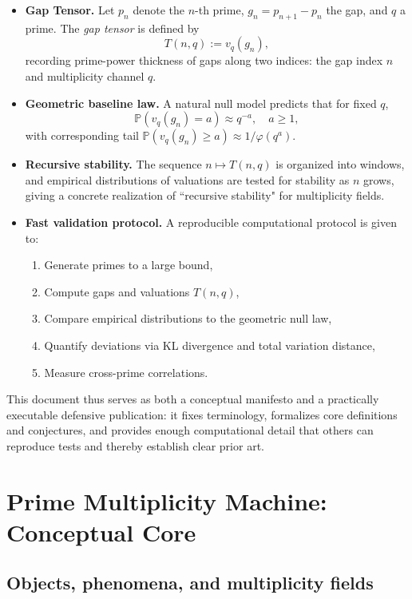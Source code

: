 \documentclass[11pt]{article}
\theoremstyle{definition}
\theoremstyle{plain}
\theoremstyle{remark}
\newcommand{\Prob}{\mathbb{P}}
\newcommand{\1}{\mathbb{1}}
\begin{document}
\begin{itemize}[leftmargin=*]
  \item \textbf{Gap Tensor.} Let \(p_n\) denote the \(n\)-th prime, \(g_n = p_{n+1}-p_n\) the gap, and \(q\) a prime. The \emph{gap tensor} is defined by
  \[
    T(n,q) := v_q(g_n),
  \]
  recording prime-power thickness of gaps along two indices: the gap index \(n\) and multiplicity channel \(q\).
  \item \textbf{Geometric baseline law.} A natural null model predicts that for fixed \(q\),
  \[
    \Prob( v_q(g_n) = a ) \approx q^{-a}, \quad a\ge 1,
  \]
  with corresponding tail \(\Prob(v_q(g_n)\ge a)\approx 1/\varphi(q^a)\).
  \item \textbf{Recursive stability.} The sequence \(n\mapsto T(n,q)\) is organized into windows, and empirical distributions of valuations are tested for stability as \(n\) grows, giving a concrete realization of ``recursive stability" for multiplicity fields.
  \item \textbf{Fast validation protocol.} A reproducible computational protocol is given to:
  \begin{enumerate}[leftmargin=*]
    \item Generate primes to a large bound,
    \item Compute gaps and valuations \(T(n,q)\),
    \item Compare empirical distributions to the geometric null law,
    \item Quantify deviations via KL divergence and total variation distance,
    \item Measure cross-prime correlations.
  \end{enumerate}
\end{itemize}

This document thus serves as both a conceptual manifesto and a practically executable defensive publication: it fixes terminology, formalizes core definitions and conjectures, and provides enough computational detail that others can reproduce tests and thereby establish clear prior art.

\section{Prime Multiplicity Machine: Conceptual Core}

\subsection{Objects, phenomena, and multiplicity fields}
\end{document}

